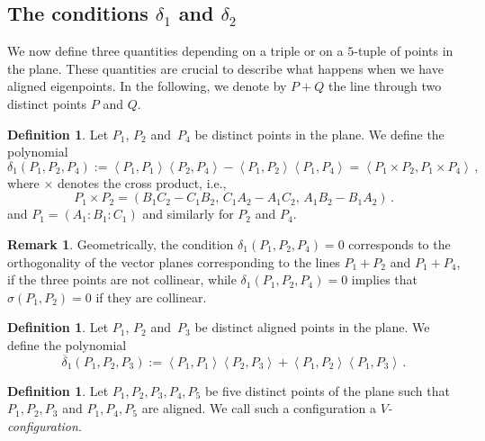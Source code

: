 \documentclass{amsart}
\theoremstyle{plain}
\theoremstyle{definition}
\newtheorem{definition}[lemma]{Definition}
\newtheorem{rmk}[lemma]{Remark}
\newcommand{\scl}[2]{\left\langle {#1}, {#2} \right\rangle}
\begin{document}
\subsection{The conditions $\delta_1$ and $\delta_2$}

We now define three quantities depending on a triple or on a $5$-tuple of points in the plane.
These quantities are crucial to describe what happens when we have aligned eigenpoints.
In the following, we denote by $P + Q$ the line through two distinct points $P$ and $Q$.

\begin{definition}
\label{definition:delta1}
 Let $P_1$, $P_2$ and~$P_4$ be distinct points in the plane.
 We define the polynomial
 \[
  \delta_1(P_1, P_2, P_4) :=
  \scl{P_1}{P_1} \scl{P_2}{P_4} - \scl{P_1}{P_2}\scl{P_1}{P_4}
  =
  \scl{P_1\times P_2}{P_1 \times P_4} \,,
 \]
 where $\times$ denotes the cross product, i.e.,
 \[
  P_1 \times P_2 = (B_1 C_2 - C_1 B_2, \, C_1 A_2 - A_1 C_2, \, A_1 B_2 - B_1 A_2) \,.
 \]
 and $P_1 = (A_1: B_1: C_1)$ and similarly for $P_2$ and $P_4$.
\end{definition}

\begin{rmk}\label{rmk: significato di delta1}
 Geometrically, the condition $\delta_1(P_1, P_2, P_4) = 0$ corresponds to the orthogonality of the vector planes corresponding to the lines $P_1 + P_2$ and $P_1 + P_4$, if the three points are not collinear, while
 $\delta_1(P_1, P_2, P_4) = 0$ implies that $\sigma (P_1,P_2)=0$ if they are collinear.
\end{rmk}


\begin{definition}
\label{definition:delta1b}
 Let $P_1$, $P_2$ and~$P_3$ be distinct aligned points in the plane.
 We define the polynomial
 \[
  \overline{\delta}_1(P_1, P_2, P_3) :=
  \scl{P_1}{P_1} \scl{P_2}{P_3} + \scl{P_1}{P_2}\scl{P_1}{P_3} \,.
  \]
\end{definition}

\begin{definition}
\label{Vconf}
Let $P_1, P_2, P_3, P_4, P_5$ be five distinct points of the plane
such that $P_1, P_2, P_3$ and $P_1, P_4, P_5$ are aligned.
We call such a configuration a \emph{$V$-configuration}.
\end{definition}
\end{document}
